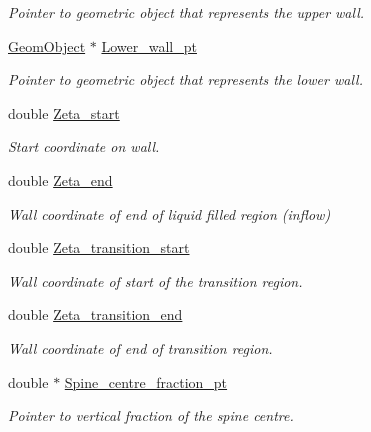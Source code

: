 \begin{DoxyCompactItemize}
\begin{DoxyCompactList}\small\item\em Pointer to geometric object that represents the upper wall. \end{DoxyCompactList}\item 
\hyperlink{classoomph_1_1GeomObject}{Geom\+Object} $\ast$ \hyperlink{classoomph_1_1BrethertonSpineMesh_a04c0136de66c06a34347b89f453730e1}{Lower\+\_\+wall\+\_\+pt}
\begin{DoxyCompactList}\small\item\em Pointer to geometric object that represents the lower wall. \end{DoxyCompactList}\item 
double \hyperlink{classoomph_1_1BrethertonSpineMesh_a0f41083aa9a97fca03d498bd6ec21eb2}{Zeta\+\_\+start}
\begin{DoxyCompactList}\small\item\em Start coordinate on wall. \end{DoxyCompactList}\item 
double \hyperlink{classoomph_1_1BrethertonSpineMesh_ac1b5e005bfb5db65f54ca599942126ea}{Zeta\+\_\+end}
\begin{DoxyCompactList}\small\item\em Wall coordinate of end of liquid filled region (inflow) \end{DoxyCompactList}\item 
double \hyperlink{classoomph_1_1BrethertonSpineMesh_af701937d59d7804f40cb1b4c7a262391}{Zeta\+\_\+transition\+\_\+start}
\begin{DoxyCompactList}\small\item\em Wall coordinate of start of the transition region. \end{DoxyCompactList}\item 
double \hyperlink{classoomph_1_1BrethertonSpineMesh_a1d05bb741eba54ab7498ab4f3c55f1b7}{Zeta\+\_\+transition\+\_\+end}
\begin{DoxyCompactList}\small\item\em Wall coordinate of end of transition region. \end{DoxyCompactList}\item 
double $\ast$ \hyperlink{classoomph_1_1BrethertonSpineMesh_af5e7951a89bc13d73f2b137947cda8a3}{Spine\+\_\+centre\+\_\+fraction\+\_\+pt}
\begin{DoxyCompactList}\small\item\em Pointer to vertical fraction of the spine centre. \end{DoxyCompactList}\item 

\end{DoxyCompactItemize}
